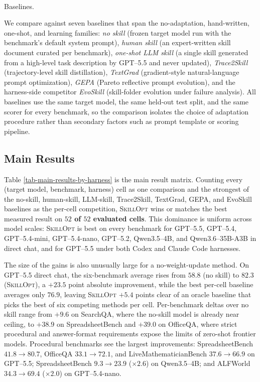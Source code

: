 \documentclass[
]{article}
\makeatletter
\let\oldparagraph\paragraph
\renewcommand{\paragraph}{
    \@ifstar
      \xxxParagraphStar
      \xxxParagraphNoStar
  }
\newcommand{\xxxParagraphStar}[1]{\oldparagraph*{#1}\mbox{}}
\newcommand{\xxxParagraphNoStar}[1]{\oldparagraph{#1}\mbox{}}
\newcommand{\ourmethod}{\textsc{SkillOpt}\xspace}
\makeatother
\begin{document}
\paragraph{Baselines.}\label{baselines.}

We compare against seven baselines that span the no-adaptation,
hand-written, one-shot, and learning families: \emph{no skill} (frozen
target model run with the benchmark's default system prompt),
\emph{human skill} (an expert-written skill document curated per
benchmark), \emph{one-shot LLM skill} (a single skill generated from a
high-level task description by GPT--5.5 and never updated),
\emph{Trace2Skill} \citep{ni2026trace2skill} (trajectory-level skill
distillation), \emph{TextGrad} \citep{yuksekgonul2024textgrad}
(gradient-style natural-language prompt optimization), \emph{GEPA}
\citep{agrawal2025gepa} (Pareto reflective prompt evolution), and the
harness-side competitor \emph{EvoSkill} \citep{alzubi2026evoskill}
(skill-folder evolution under failure analysis). All baselines use the
same target model, the same held-out test split, and the same scorer for
every benchmark, so the comparison isolates the choice of adaptation
procedure rather than secondary factors such as prompt template or
scoring pipeline.

\subsection{Main Results}\label{sec-main-results}

Table \ref{tab-main-results-by-harness} is the main result matrix.
Counting every (target model, benchmark, harness) cell as one comparison
and the strongest of the no-skill, human-skill, LLM-skill, Trace2Skill,
TextGrad, GEPA, and EvoSkill baselines as the per-cell competition,
\ourmethod{} wins or matches the best measured result on
\textbf{$52$ of $52$ evaluated cells}. This dominance is uniform across
model scales: \ourmethod{} is best on every benchmark for GPT--5.5,
GPT--5.4, GPT--5.4-mini, GPT--5.4-nano, GPT--5.2, Qwen3.5--4B, and
Qwen3.6--35B-A3B in direct chat, and for GPT--5.5 under both Codex and
Claude Code harnesses.

The size of the gains is also unusually large for a no-weight-update
method. On GPT--5.5 direct chat, the six-benchmark average rises from
\(58.8\) (no skill) to \(82.3\) (\ourmethod{}), a \(+23.5\) point
absolute improvement, while the best per-cell baseline averages only
\(76.9\), leaving \ourmethod{} \(+5.4\) points clear of an oracle
baseline that picks the best of six competing methods per cell.
Per-benchmark deltas over no skill range from \(+9.6\) on SearchQA,
where the no-skill model is already near ceiling, to \(+38.9\) on
SpreadsheetBench and \(+39.0\) on OfficeQA, where strict procedural and
answer-format requirements expose the limits of zero-shot frontier
models. Procedural benchmarks see the largest improvements:
SpreadsheetBench \(41.8{\to}80.7\), OfficeQA \(33.1{\to}72.1\), and
LiveMathematicianBench \(37.6{\to}66.9\) on GPT--5.5; SpreadsheetBench
\(9.3{\to}23.9\) (\(\times 2.6\)) on Qwen3.5--4B; and ALFWorld
\(34.3{\to}69.4\) (\(\times 2.0\)) on GPT--5.4-nano.
\end{document}
